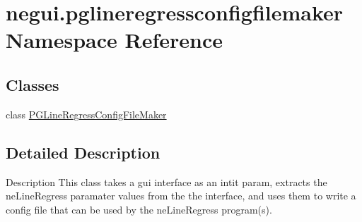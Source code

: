 \hypertarget{namespacenegui_1_1pglineregressconfigfilemaker}{}\section{negui.\+pglineregressconfigfilemaker Namespace Reference}
\label{namespacenegui_1_1pglineregressconfigfilemaker}
\subsection*{Classes}
\begin{DoxyCompactItemize}
\item 
class \hyperlink{classnegui_1_1pglineregressconfigfilemaker_1_1PGLineRegressConfigFileMaker}{P\+G\+Line\+Regress\+Config\+File\+Maker}
\end{DoxyCompactItemize}


\subsection{Detailed Description}
\begin{DoxyVerb}Description
This class takes a gui interface as an intit param, extracts the
neLineRegress paramater values from the the interface, and uses
them to write a config file that can be used by the neLineRegress program(s).
\end{DoxyVerb}
 